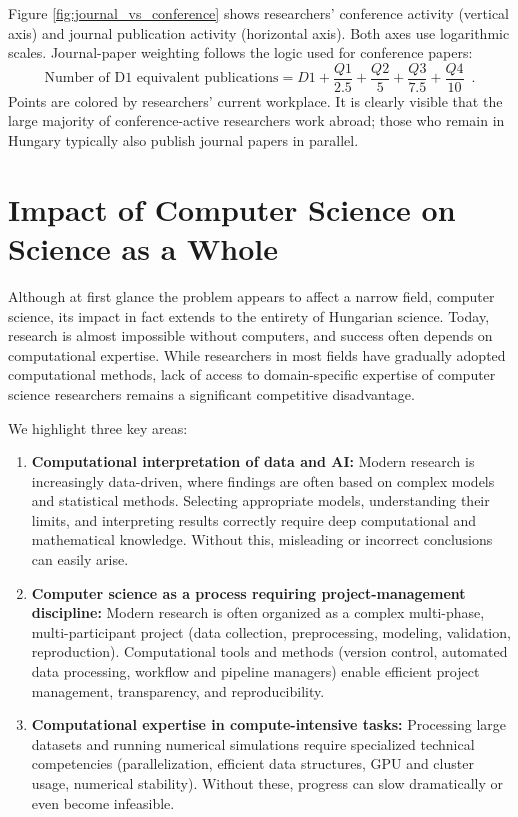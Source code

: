 \documentclass[12pt,a4paper]{article}
\begin{document}
Figure \ref{fig:journal_vs_conference} shows researchers' conference activity (vertical axis) and journal publication activity (horizontal axis). Both axes use logarithmic scales. Journal-paper weighting follows the logic used for conference papers:
\begin{equation}
\textrm{Number of D1 equivalent publications} = D1 + \frac{Q1}{2.5} + \frac{Q2}{5} + \frac{Q3}{7.5} + \frac{Q4}{10} \enspace.
\label{eq:weights2}
\end{equation}
Points are colored by researchers' current workplace. It is clearly visible that the large majority of conference-active researchers work abroad; those who remain in Hungary typically also publish journal papers in parallel.



\section{Impact of Computer Science on Science as a Whole}

Although at first glance the problem appears to affect a narrow field, computer science, its impact in fact extends to the entirety of Hungarian science. Today, research is almost impossible without computers, and success often depends on computational expertise. While researchers in most fields have gradually adopted computational methods, lack of access to domain-specific expertise of computer science researchers remains a significant competitive disadvantage.

We highlight three key areas:
\begin{enumerate}
\item \textbf{Computational interpretation of data and AI:} Modern research is increasingly data-driven, where findings are often based on complex models and statistical methods. Selecting appropriate models, understanding their limits, and interpreting results correctly require deep computational and mathematical knowledge. Without this, misleading or incorrect conclusions can easily arise.

\item \textbf{Computer science as a process requiring project-management discipline:} Modern research is often organized as a complex multi-phase, multi-participant project (data collection, preprocessing, modeling, validation, reproduction). Computational tools and methods (version control, automated data processing, workflow and pipeline managers) enable efficient project management, transparency, and reproducibility.

\item \textbf{Computational expertise in compute-intensive tasks:} Processing large datasets and running numerical simulations require specialized technical competencies (parallelization, efficient data structures, GPU and cluster usage, numerical stability). Without these, progress can slow dramatically or even become infeasible.
\end{enumerate}
\end{document}
